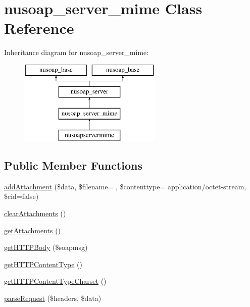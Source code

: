 \hypertarget{classnusoap__server__mime}{}\section{nusoap\+\_\+server\+\_\+mime Class Reference}
\label{classnusoap__server__mime}
Inheritance diagram for nusoap\+\_\+server\+\_\+mime\+:\begin{figure}[H]
\begin{center}
\leavevmode
\includegraphics[height=4.000000cm]{classnusoap__server__mime}
\end{center}
\end{figure}
\subsection*{Public Member Functions}
\begin{DoxyCompactItemize}
\item 
\hyperlink{classnusoap__server__mime_a05ac1d60ed38ac1db78295337c99eb86}{add\+Attachment} (\$data, \$filename= \textquotesingle{}\textquotesingle{}, \$contenttype= \textquotesingle{}application/octet-\/stream\textquotesingle{}, \$cid=false)
\item 
\hyperlink{classnusoap__server__mime_a2b4d4199414b58bc4db009cb17ad8e3b}{clear\+Attachments} ()
\item 
\hyperlink{classnusoap__server__mime_aa91862c4e237ee5b53083f41633babb6}{get\+Attachments} ()
\item 
\hyperlink{classnusoap__server__mime_ab1e22b0858bdbe61d2d711ff442c0e78}{get\+H\+T\+T\+P\+Body} (\$soapmsg)
\item 
\hyperlink{classnusoap__server__mime_a2bed19ef2d537dee244535339cd6026a}{get\+H\+T\+T\+P\+Content\+Type} ()
\item 
\hyperlink{classnusoap__server__mime_a9051db33a9b7e50315d9222ef1c52ce9}{get\+H\+T\+T\+P\+Content\+Type\+Charset} ()
\item 
\hyperlink{classnusoap__server__mime_a7a69990540b6dc277f2775abd40772a1}{parse\+Request} (\$headers, \$data)
\end{DoxyCompactItemize}
